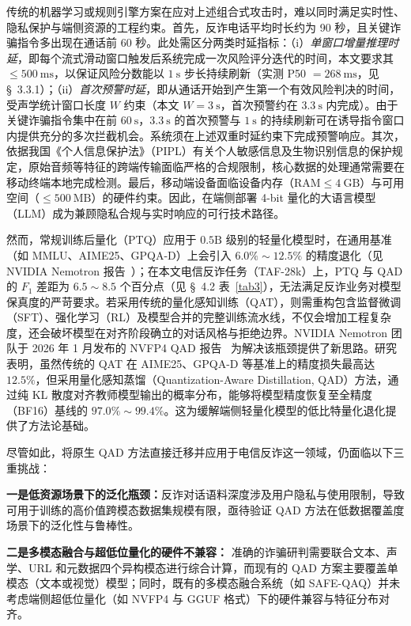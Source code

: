\documentclass[11pt, a4paper]{article}
\begin{document}
传统的机器学习或规则引擎方案在应对上述组合式攻击时，难以同时满足实时性、隐私保护与端侧资源的工程约束。首先，反诈电话平均时长约为 90 秒，且关键诈骗指令多出现在通话前 60 秒。此处需区分两类时延指标：（i）\emph{单窗口增量推理时延}，即每个流式滑动窗口触发后系统完成一次风险评分迭代的时间，本文要求其 $\le 500~\text{ms}$，以保证风险分数能以 $1~\text{s}$ 步长持续刷新（实测 P50 $=268~\text{ms}$，见 \S~3.3.1）；（ii）\emph{首次预警时延}，即从通话开始到产生第一个有效风险判决的时间，受声学统计窗口长度 $W$ 约束（本文 $W=3~\text{s}$，首次预警约在 $3.3~\text{s}$ 内完成）。由于关键诈骗指令集中在前 $60~\text{s}$，$3.3~\text{s}$ 的首次预警与 $1~\text{s}$ 的持续刷新可在诱导指令窗口内提供充分的多次拦截机会。系统须在上述双重时延约束下完成预警响应。其次，依据我国《个人信息保护法》（PIPL）有关个人敏感信息及生物识别信息的保护规定，原始音频等特征的跨端传输面临严格的合规限制，核心数据的处理通常需要在移动终端本地完成检测。最后，移动端设备面临设备内存（$\text{RAM} \le 4~\text{GB}$）与可用空间（$\le 500~\text{MB}$）的硬件约束。因此，在端侧部署 4-bit 量化的大语言模型（LLM）成为兼顾隐私合规与实时响应的可行技术路径。

然而，常规训练后量化（PTQ）应用于 $0.5\text{B}$ 级别的轻量化模型时，在通用基准（如 MMLU、AIME25、GPQA-D）上会引入 $6.0\%\sim12.5\%$ 的精度退化（见 NVIDIA Nemotron 报告~\cite{3}）；在本文电信反诈任务（TAF-28k）上，PTQ 与 QAD 的 $F_1$ 差距为 $6.5\sim8.5$ 个百分点（见 \S~4.2 表~\ref{tab3}），无法满足反诈业务对模型保真度的严苛要求。若采用传统的量化感知训练（QAT），则需重构包含监督微调（SFT）、强化学习（RL）及模型合并的完整训练流水线，不仅会增加工程复杂度，还会破坏模型在对齐阶段确立的对话风格与拒绝边界。NVIDIA Nemotron 团队于 2026 年 1 月发布的 NVFP4 QAD 报告~\cite{3} 为解决该瓶颈提供了新思路。研究表明，虽然传统的 QAT 在 AIME25、GPQA-D 等基准上的精度损失最高达 $12.5\%$，但采用量化感知蒸馏（Quantization-Aware Distillation, QAD）方法，通过纯 KL 散度对齐教师模型输出的概率分布，能够将模型精度恢复至全精度（BF16）基线的 $97.0\%\sim99.4\%$。这为缓解端侧轻量化模型的低比特量化退化提供了方法论基础。

尽管如此，将原生 QAD 方法直接迁移并应用于电信反诈这一领域，仍面临以下三重挑战：

\textbf{一是低资源场景下的泛化瓶颈：}反诈对话语料深度涉及用户隐私与使用限制，导致可用于训练的高价值跨模态数据集规模有限，亟待验证 QAD 方法在低数据覆盖度场景下的泛化性与鲁棒性。

\textbf{二是多模态融合与超低位量化的硬件不兼容：} 准确的诈骗研判需要联合文本、声学、URL 和元数据四个异构模态进行综合计算，而现有的 QAD 方案主要覆盖单模态（文本或视觉）模型；同时，既有的多模态融合系统（如 SAFE-QAQ）并未考虑端侧超低位量化（如 NVFP4 与 GGUF 格式）下的硬件兼容与特征分布对齐。
\end{document}
